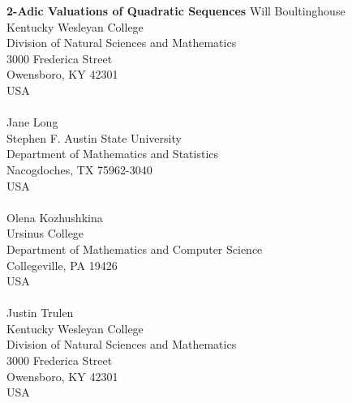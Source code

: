 \documentclass[12pt]{article}
\begin{document}
\begin{center}
\epsfxsize=4in
\end{center}

\theoremstyle{plain}
\newtheorem{theorem}{Theorem}
\newtheorem{corollary}[theorem]{Corollary}
\newtheorem{lemma}[theorem]{Lemma}
\newtheorem{proposition}[theorem]{Proposition}
\newtheorem{claim}[theorem]{Claim}

\theoremstyle{definition}
\newtheorem{definition}[theorem]{Definition}
\newtheorem{example}[theorem]{Example}
\newtheorem{conjecture}[theorem]{Conjecture}

\theoremstyle{remark}
\newtheorem{remark}[theorem]{Remark}

\begin{center}
\vskip 1cm{\LARGE\bf 
2-Adic Valuations of Quadratic Sequences
}
\vskip 1cm
Will Boultinghouse\\
Kentucky Wesleyan College\\
Division of Natural Sciences and Mathematics\\
3000 Frederica Street\\
Owensboro, KY 42301 \\
USA\\

\ \\
Jane Long\\
Stephen F. Austin State University\\
Department of Mathematics and Statistics\\
Nacogdoches, TX 75962-3040 \\
USA\\

\ \\

Olena Kozhushkina\\
Ursinus College\\
Department of Mathematics and Computer Science\\
Collegeville, PA 19426\\
USA \\

\ \\

Justin Trulen\\
Kentucky Wesleyan College\\
Division of Natural Sciences and Mathematics\\
3000 Frederica Street\\
Owensboro, KY 42301 \\
USA\\

\end{center}
\end{document}
